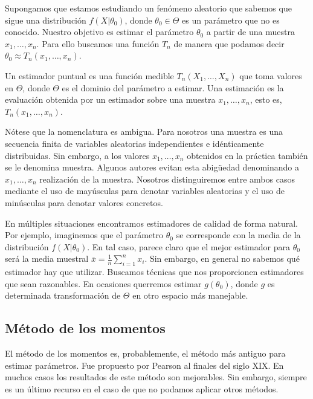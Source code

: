 \documentclass{article}
\begin{document}
Supongamos que estamos estudiando un fenómeno aleatorio que sabemos que sigue una distribución $f(X | \theta_0)$, donde $\theta_0 \in \Theta$ es un parámetro que no es conocido. Nuestro objetivo es estimar el parámetro $\theta_0$ a partir de una muestra $x_1, \ldots, x_n$. Para ello buscamos una función $T_n$ de manera que podamos decir $\theta_0 \approx T_n(x_1, \ldots, x_n)$.

\begin{definition}
    Un estimador puntual es una función medible $T_n(X_1, \ldots, X_n)$ que toma valores en $\Theta$, donde $\Theta$ es el dominio del parámetro a estimar. Una estimación es la evaluación obtenida por un estimador sobre una muestra $x_1, \ldots, x_n$, esto es, $T_n(x_1, \ldots, x_n)$.
\end{definition}

Nótese que la nomenclatura es ambigua. Para nosotros una muestra es una secuencia finita de variables aleatorias independientes e idénticamente distribuidas. Sin embargo, a los valores $x_1, \ldots, x_n$ obtenidos en la práctica también se le denomina muestra. Algunos autores evitan esta abigüedad denominando a $x_1, \ldots, x_n$ realización de la muestra. Nosotros distinguiremos entre ambos casos mediante el uso de mayúsculas para denotar variables aleatorias y el uso de minúsculas para denotar valores concretos.

En múltiples situaciones encontramos estimadores de calidad de forma natural. Por ejemplo, imaginemos que el parámetro $\theta_0$ se corresponde con la media de la distribución $f(X | \theta_0)$. En tal caso, parece claro que el mejor estimador para $\theta_0$ será la media muestral $\overline{x} = \frac{1}{n}\sum_{i = 1}^n x_i$. Sin embargo, en general no sabemos qué estimador hay que utilizar. Buscamos técnicas que nos proporcionen estimadores que sean razonables. En ocasiones querremos estimar $g(\theta_0)$, donde $g$ es determinada transformación de $\Theta$ en otro espacio más manejable.

\subsection{Método de los momentos}

El método de los momentos es, probablemente, el método más antiguo para estimar parámetros. Fue propuesto por Pearson al finales del siglo XIX. En muchos casos los resultados de este método son mejorables. Sin embargo, siempre es un último recurso en el caso de que no podamos aplicar otros métodos.
\end{document}
